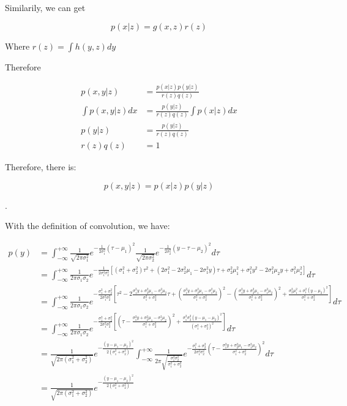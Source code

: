 \documentclass[UTF8]{article}
\begin{document}
Similarily, we can get

$$p(x|z) = g(x,z)r(z)$$

Where $r(z) = \int h(y,z)dy$

Therefore

\begin{align*}
    p(x,y|z) &= \frac{p(x|z)p(y|z)}{r(z)q(z)} \\
    \int p(x,y|z)dx& = \frac{p(y|z)}{r(z)q(z)}\int p(x|z)dx\\
    p(y|z) &= \frac{p(y|z)}{r(z)q(z)}\\
    r(z)q(z) & = 1
\end{align*}

Therefore, there is:

$$p(x,y|z) = p(x|z)p(y|z)$$

\qedsymbol

.

With the definition of convolution, we have:

\begin{align*}
    p(y)& = \int_{-\infty}^{+\infty}\frac{1}{\sqrt{2\pi\sigma_1^2}}e^{-\frac{1}{2\sigma_1^2}(\tau-\mu_1)^2}\frac{1}{\sqrt{2\pi\sigma_2^2}}e^{-\frac{1}{2\sigma_2^2}(y-\tau-\mu_2)^2}d\tau\\
        &= \int_{-\infty}^{+\infty}\frac{1}{2\pi\sigma_1\sigma_2}e^{-\frac{1}{2\sigma_1^2\sigma_2^2}[(\sigma_1^2+\sigma_2^2)\tau^2+(2\sigma_1^2-2\sigma_2^2\mu_1-2\sigma_1^2y)\tau+\sigma_2^2\mu_1^2+\sigma_1^2y^2-2\sigma_1^2\mu_2y+\sigma_1^2\mu_2^2]}d\tau\\
        &= \int_{-\infty}^{+\infty}\frac{1}{2\pi\sigma_1\sigma_2}e^{-\frac{\sigma_1^2+\sigma_2^2}{2\sigma_1^2\sigma_2^2}[\tau^2-2\frac{\sigma_1^2 y+\sigma_2^2 \mu_1-\sigma_1^2 \mu_2}{\sigma_1^2+\sigma_2^2}\tau+(\frac{\sigma_1^2 y+\sigma_2^2 \mu_1-\sigma_1^2 \mu_2}{\sigma_1^2+\sigma_2^2})^2-(\frac{\sigma_1^2 y+\sigma_2^2 \mu_1-\sigma_1^2 \mu_2}{\sigma_1^2+\sigma_2^2})^2+\frac{\sigma_2^2 \mu_1^2+\sigma_1^2(y-\mu_2)^2}{\sigma_1^2+\sigma_2^2}]}d\tau\\
        &= \int_{-\infty}^{+\infty}\frac{1}{2\pi\sigma_1\sigma_2}e^{-\frac{\sigma_1^2+\sigma_2^2}{2\sigma_1^2\sigma_2^2}[(\tau-\frac{\sigma_1^2 y+\sigma_2^2 \mu_1-\sigma_1^2 \mu_2}{\sigma_1^2+\sigma_2^2})^2+\frac{\sigma_1^2\sigma_2^2(y-\mu_1-\mu_2)^2}{(\sigma_1^2+\sigma_2^2)^2}]}d\tau\\
        & = \frac{1}{\sqrt{2\pi(\sigma_1^2+\sigma_2^2)}}e^{-\frac{(y-\mu_1-\mu_2)^2}{2(\sigma_1^2+\sigma_2^2)}}\int_{-\infty}^{+\infty}\frac{1}{2\pi\sqrt{\frac{\sigma_1^2\sigma_2^2}{\sigma_1^2+\sigma_2^2}}}e^{-\frac{\sigma_1^2+\sigma_2^2}{2\sigma_1^2\sigma_2^2}(\tau-\frac{\sigma_1^2 y+\sigma_2^2 \mu_1-\sigma_1^2 \mu_2}{\sigma_1^2+\sigma_2^2})^2}d\tau\\
        & = \frac{1}{\sqrt{2\pi(\sigma_1^2+\sigma_2^2)}}e^{-\frac{(y-\mu_1-\mu_2)^2}{2(\sigma_1^2+\sigma_2^2)}}
\end{align*}
\end{document}
